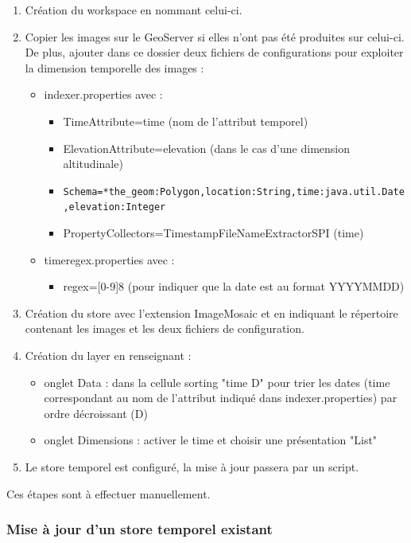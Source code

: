 \documentclass[10pt,a4paper]{article}
\begin{document}
\begin{enumerate}
\item Création du workspace en nommant celui-ci.
\item Copier les images sur le GeoServer si elles n'ont pas été produites sur celui-ci. De plus, ajouter dans ce dossier deux fichiers de configurations pour exploiter la dimension temporelle des images :
\begin{itemize}
\item indexer.properties avec :
\begin{itemize}
\item TimeAttribute=time (nom de l'attribut temporel)
\item ElevationAttribute=elevation (dans le cas d'une dimension altitudinale)
\item \verb!Schema=*the_geom:Polygon,location:String,!\newline \verb!time:java.util.Date,elevation:Integer!
\item PropertyCollectors=TimestampFileNameExtractorSPI \newline [timeregex](time)
\end{itemize}
\item timeregex.properties avec :
\begin{itemize}
\item regex=[0-9]{8} (pour indiquer que la date est au format YYYYMMDD)
\end{itemize}
\end{itemize}
\item Création du store avec l'extension ImageMosaic et en indiquant le répertoire contenant les images et les deux fichiers de configuration.
\item Création du layer en renseignant :
\begin{itemize}
\item onglet Data : dans la cellule sorting "time D" pour trier les dates (time correspondant au nom de l'attribut indiqué dans indexer.properties) par ordre décroissant (D)
\item onglet Dimensions : activer le time et choisir une présentation "List"
\end{itemize}
\item Le store temporel est configuré, la mise à jour passera par un script.
\end{enumerate}

Ces étapes sont à effectuer manuellement.

\subsubsection{Mise à jour d'un store temporel existant}
\end{document}
